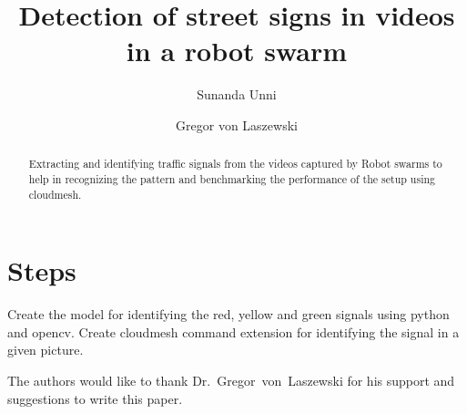 
\title{Detection of street signs in videos in a robot swarm}


\author{Sunanda Unni}

\author{Gregor von Laszewski}


\renewcommand{\shortauthors}{G. v. Laszewski}


\begin{abstract}
  Extracting and identifying traffic signals from the videos captured
  by Robot swarms to help in recognizing the pattern and benchmarking
  the performance of the setup using cloudmesh.
\end{abstract}



\maketitle

\section{Steps}
Create the model for identifying the red, yellow and green signals
using python and opencv\cite{www-opencv}.  Create cloudmesh command
extension for identifying the signal in a given picture.


\begin{acks}

  The authors would like to thank Dr.~Gregor~von~Laszewski for his
  support and suggestions to write this paper.

\end{acks}


 

